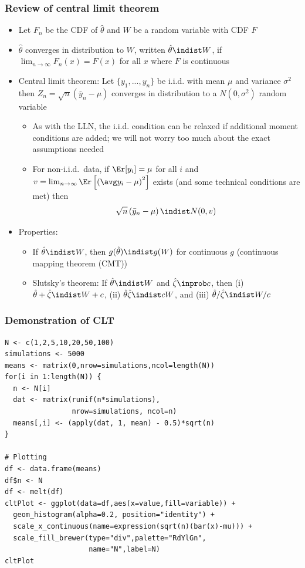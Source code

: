 \begin{frame}[allowframebreaks]\frametitle{Review of central limit theorem}
  \begin{itemize}
  \item Let $F_n$ be the CDF of $\hat{\theta}$ and $W$ be a random variable
    with CDF $F$
  \item $\hat{\theta}$ \alert{converges in distribution} to $W$, written $\hat{\theta} \indist
    W$, if $\lim_{n \to \infty} F_n(x) = F(x)$ for all $x$ where $F$
    is continuous 
  \item \alert{Central limit theorem}: Let $\{y_1, ..., y_n\}$ be i.i.d.
    with mean $\mu$ and variance $\sigma^2$ then $Z_n =
    \sqrt{n}\left(\bar{y}_n - \mu\right)$ converges in distribution
    to a $N(0,\sigma^2)$ random variable
    \begin{itemize}
    \item As with the LLN, the i.i.d. condition can be relaxed if
      additional moment conditions are added; we will not worry too
      much about the exact assumptions needed
    \item For non-i.i.d.\ data, if $\Er[y_i] = \mu$ for all $i$ and $v
      = \lim_{n \to \infty} 
      \Er\left[ \left(\avg y_i - \mu \right)^2 \right]$ exists (and
      some technical conditions are met) then 
      \[ \sqrt{n}\left(\bar{y}_n - \mu \right) \indist N(0,v) \]
    \end{itemize}
  \item Properties:
    \begin{itemize}
    \item If $\hat{\theta} \indist W$, then $g(\hat{\theta}) \indist g(W)$ for
      continuous $g$ (\alert{continuous mapping theorem (CMT)})
    \item \alert{Slutsky's theorem}: If $\hat{\theta} \indist W$ and
      $\hat{\zeta} \inprob c$, then (i) $\hat{\theta} + 
      \hat{\zeta} \indist W + c$, (ii) $\hat{\theta} \hat{\zeta} \indist c W$, and (iii)
      $\hat{\theta}/\hat{\zeta} \indist W/c$
    \end{itemize}
  \end{itemize}
\end{frame}

\begin{frame}
  \frametitle{Demonstration of CLT}
  \begin{lstlisting}
N <- c(1,2,5,10,20,50,100)
simulations <- 5000
means <- matrix(0,nrow=simulations,ncol=length(N))
for(i in 1:length(N)) {
  n <- N[i]
  dat <- matrix(runif(n*simulations),
                nrow=simulations, ncol=n)
  means[,i] <- (apply(dat, 1, mean) - 0.5)*sqrt(n)
}

# Plotting
df <- data.frame(means)
df$n <- N
df <- melt(df)
cltPlot <- ggplot(data=df,aes(x=value,fill=variable)) +
  geom_histogram(alpha=0.2, position="identity") +
  scale_x_continuous(name=expression(sqrt(n)(bar(x)-mu))) +
  scale_fill_brewer(type="div",palette="RdYlGn",
                    name="N",label=N) 
cltPlot   
  \end{lstlisting} %
\end{frame}

